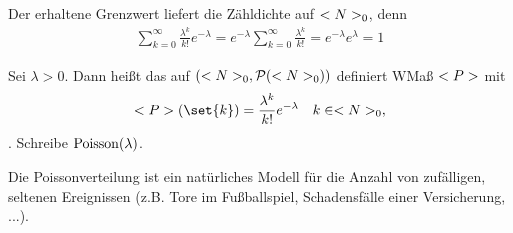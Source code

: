Der erhaltene Grenzwert liefert die Zähldichte auf $<N>_{0}$, denn 
\begin{align}
	\sum_{k=0}^{\infty}\frac{\lambda^k}{k!}e^{-\lambda} = e^{-\lambda}\sum_{k=0}^{\infty}\frac{\lambda^{k}}{k!} = e^{-\lambda}e^{\lambda} = 1
\end{align}

\begin{definition}
	Sei $\lambda >0$. Dann heißt das auf $(<N>_{0}, \mathcal{P}(<N>_{0}))$ definiert WMaß $<P>$ mit
	\begin{align}
		\probp(\set{k}) = \frac{\lambda^k}{k!}e^{-\lambda} \quad k \in \N_{0},
	\end{align}
	. Schreibe $\operatorname{Poisson}(\lambda)$.
\end{definition}

Die Poissonverteilung ist ein natürliches Modell für die Anzahl von zufälligen, seltenen Ereignissen (z.B. Tore im Fußballspiel, Schadensfälle einer Versicherung, ...).